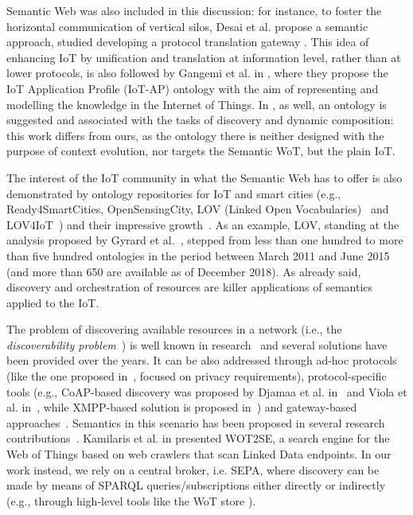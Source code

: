 Semantic Web was also included in this discussion: for instance, to foster the horizontal communication of vertical silos, Desai et al. propose a semantic approach, studied developing a protocol translation gateway \cite{desai2015semantic}. This idea of enhancing IoT by unification and translation at information level, rather than at lower protocols, is also followed by Gangemi et al. in \cite{gangemipattern}, where they propose the IoT Application Profile (IoT-AP) ontology with the aim of representing and modelling the knowledge in the Internet of Things. In \cite{wang2012comprehensive}, as well, an ontology is suggested and associated with the tasks of discovery and dynamic composition: this work differs from ours, as the ontology there is neither designed with the purpose of context evolution, nor targets the Semantic WoT, but the plain IoT.

The interest of the IoT community in what the Semantic Web has to offer is
also demonstrated by ontology repositories for IoT and smart cities (e.g., Ready4SmartCities, OpenSensingCity, LOV (Linked Open Vocabularies)~\cite{vandenbussche2017linked} and LOV4IoT~\cite{gyrard2016lov4iot})
and their impressive growth~\cite{Gyrard2018BuildingIA}. As an example, LOV, standing
at the analysis proposed by Gyrard et al.~\cite{Gyrard2018BuildingIA}, stepped from less than one hundred to more than five hundred ontologies in the period between March 2011 and June 2015 (and more than 650 are available as of December 2018). As already said, discovery and orchestration of resources are killer applications of semantics applied to the IoT. 

The problem of discovering available resources in a network (i.e., the \textit{discoverability problem}~\cite{guinard2016building}) is well known in research~\cite{Razzaque2016MiddlewareFI} and several solutions have been provided over the years. It can be also addressed through ad-hoc protocols (like the one proposed in~\cite{wu2016privacy}, focused on privacy requirements), protocol-specific tools (e.g., CoAP-based discovery was proposed by Djamaa et al. in~\cite{djamaa2018fetchiot} and Viola et al. in~\cite{viola2018cminor}, while XMPP-based solution is proposed in~\cite{waher2018internet}) and gateway-based approaches~\cite{cirani2014scalable}. Semantics in this scenario has been proposed in several research contributions~\cite{mayer2011extensible,Fredj2014EfficientSI,desai2015semantic,Ganzha2016SemanticTF,gao2014semantic}. Kamilaris et al. in \cite{kamilaris2016wots2e} presented WOT2SE, a search engine for the Web of Things based on web crawlers that scan Linked Data endpoints. In our work instead, we rely on a central broker, i.e. SEPA, where discovery can be made by means of SPARQL queries/subscriptions either directly or indirectly (e.g., through high-level tools like the WoT store \cite{sciullo2019wot}).

